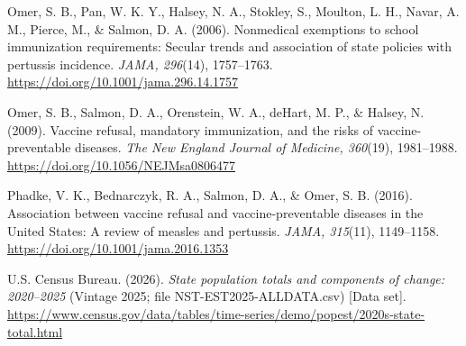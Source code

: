 \documentclass[12pt]{article}
\begin{document}
Omer, S. B., Pan, W. K. Y., Halsey, N. A., Stokley, S., Moulton, L. H., Navar, A. M., Pierce, M., \& Salmon, D. A. (2006). Nonmedical exemptions to school immunization requirements: Secular trends and association of state policies with pertussis incidence. \emph{JAMA, 296}(14), 1757--1763. \url{https://doi.org/10.1001/jama.296.14.1757}

Omer, S. B., Salmon, D. A., Orenstein, W. A., deHart, M. P., \& Halsey, N. (2009). Vaccine refusal, mandatory immunization, and the risks of vaccine-preventable diseases. \emph{The New England Journal of Medicine, 360}(19), 1981--1988. \url{https://doi.org/10.1056/NEJMsa0806477}

Phadke, V. K., Bednarczyk, R. A., Salmon, D. A., \& Omer, S. B. (2016). Association between vaccine refusal and vaccine-preventable diseases in the United States: A review of measles and pertussis. \emph{JAMA, 315}(11), 1149--1158. \url{https://doi.org/10.1001/jama.2016.1353}

U.S. Census Bureau. (2026). \emph{State population totals and components of change: 2020--2025} (Vintage 2025; file NST-EST2025-ALLDATA.csv) [Data set]. \url{https://www.census.gov/data/tables/time-series/demo/popest/2020s-state-total.html}
\endgroup
\end{document}
